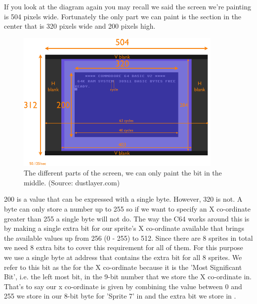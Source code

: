 If you look at the diagram again you may recall we said the screen we're painting is 504 pixels wide. Fortunately the only 
part we can paint is the section in the center that is 320 pixels wide and 200 pixels high. 

\begin{figure}[H]
    \centering
      \includegraphics[width=10cm]{titlescreen/raster.png}%
  \caption{The different parts of the screen, we can only paint the bit in the middle. (Source: dustlayer.com)}
\end{figure}

200 is a value that can be expressed with a single byte. However, 320 is not. A byte can only store a number up to 255
so if we want to specify an X co-ordinate greater than 255 a single byte will not do. The way the C64 works around this
is by making a single extra bit for our sprite's X co-ordinate available that brings the available values up from 256
(0 - 255) to 512. Since there are 8 sprites in total we need 8 extra bits to cover this requirement for all of them.
For this purpose we use a single byte at address  that contains the extra bit for all 8 sprites. We refer
to this bit as the  for the X co-ordinate because it is the 'Most Significant Bit', i.e. the left most bit,
in the 9-bit number that we store the X co-ordinate in. That's to say our x co-ordinate is given by combining the value
between 0 and 255 we store in our 8-bit byte for 'Sprite 7' in  and the extra bit we store in .

